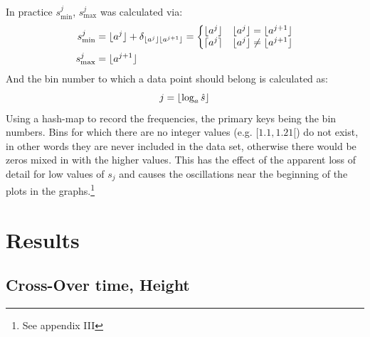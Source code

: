 \documentclass[twoside]{article}
\DeclarePairedDelimiter\ceil{\lceil}{\rceil}
\DeclarePairedDelimiter\floor{\lfloor}{\rfloor}
\begin{document}
In practice $s_{\text{min}}^j$, $s_{\text{max}}^j$ was calculated via:
\begin{align*}
s_{\text{min}}^j & = \floor{a^j} + \delta_{\floor{a^j} \floor{a^{j+1}}} = \left\{ \begin{matrix}\floor{a^j} \quad \floor{a^j} = \floor{a^{j+1}} \\ \ceil{a^j} \quad \floor{a^j} \neq \floor{a^{j+1}}   \end{matrix} \right. \\
s_{\text{max}}^j &= \floor{a^{j+1}} 
\end{align*}
And the bin number to which a data point should belong is calculated as:
\[
j=\floor{\log_a \hat{s}}
\]
Using a hash-map to record the frequencies, the primary keys being the bin numbers. Bins for which there are no integer values (e.g. $[1.1, 1.21 [$) do not exist, in other words they are never included in the data set, otherwise there would be zeros mixed in with the higher values. This has the effect of the apparent loss of detail for low values of $s_j$ and causes the oscillations near the beginning of the plots in the graphs.\footnote{See appendix III}




\section{Results}
\subsection{Cross-Over time, Height}
\end{document}
